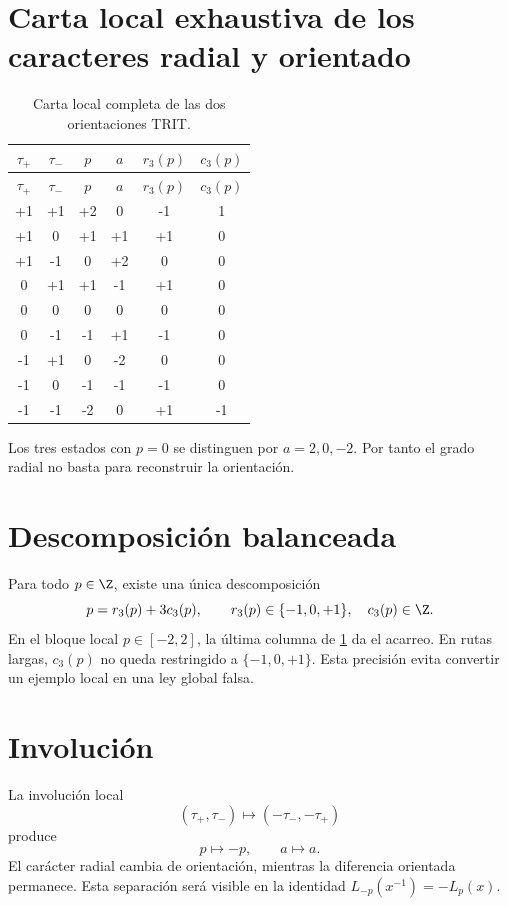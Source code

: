 \section{Carta local exhaustiva de los caracteres radial y orientado}

\begin{longtable}{cccccc}
\caption{Carta local completa de las dos orientaciones TRIT.}
\label{espiral:tab:doble-trit}\\
\toprule
\(\tau_+\)&\(\tau_-\)&\(p\)&\(a\)&\(r_3(p)\)&\(c_3(p)\)\\
\midrule
\endfirsthead
\toprule
\(\tau_+\)&\(\tau_-\)&\(p\)&\(a\)&\(r_3(p)\)&\(c_3(p)\)\\
\midrule
\endhead
+1&+1&+2&0&-1&1\\
+1&0&+1&+1&+1&0\\
+1&-1&0&+2&0&0\\
0&+1&+1&-1&+1&0\\
0&0&0&0&0&0\\
0&-1&-1&+1&-1&0\\
-1&+1&0&-2&0&0\\
-1&0&-1&-1&-1&0\\
-1&-1&-2&0&+1&-1\\
\bottomrule
\end{longtable}

Los tres estados con \(p=0\) se distinguen por
\(a=2,0,-2\). Por tanto el grado radial no basta para
reconstruir la orientación.

\section{Descomposición balanceada}

Para todo \(p\in\Z\), existe una única descomposición
\[
 p=r_3(p)+3c_3(p),
 \qquad r_3(p)\in\{-1,0,+1\},\quad c_3(p)\in\Z.
\]
En el bloque local \(p\in[-2,2]\), la última columna de
\cref{espiral:tab:doble-trit} da el acarreo. En rutas largas, \(c_3(p)\) no queda
restringido a \(\{-1,0,+1\}\). Esta precisión evita convertir un ejemplo
local en una ley global falsa.

\section{Involución}

La involución local
\[
 (\tau_+,\tau_-)\longmapsto(-\tau_-,-\tau_+)
\]
produce
\[
 p\longmapsto-p,
 \qquad
 a\longmapsto a.
\]
El carácter radial cambia de orientación, mientras la diferencia orientada
permanece. Esta separación será visible en la identidad
\(L_{-p}(x^{-1})=-L_p(x)\).

